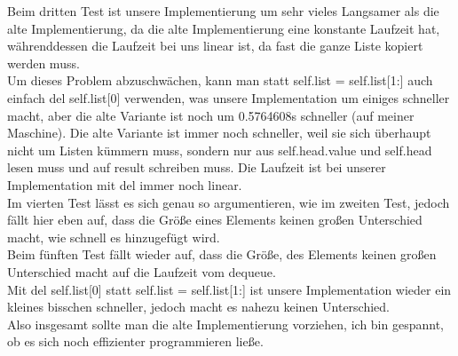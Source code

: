 \documentclass[12pt, a4paper]{article}
\begin{document}
Beim dritten Test ist unsere Implementierung um sehr vieles Langsamer als die alte Implementierung, da die alte Implementierung eine konstante Laufzeit hat, währenddessen die Laufzeit bei uns linear ist, da fast die ganze Liste kopiert werden muss. \\
Um dieses Problem abzuschwächen, kann man statt self.list = self.list[1:] auch einfach del self.list[0] verwenden, was unsere Implementation um einiges schneller macht, aber die alte Variante ist noch um 0.5764608s schneller (auf meiner Maschine). Die alte Variante ist immer noch schneller, weil sie sich überhaupt nicht um Listen kümmern muss, sondern nur aus self.head.value und self.head lesen muss und auf result schreiben muss. Die Laufzeit ist bei unserer Implementation mit del immer noch linear. \\
Im vierten Test lässt es sich genau so argumentieren, wie im zweiten Test, jedoch fällt hier eben auf, dass die Größe eines Elements keinen großen Unterschied macht, wie schnell es hinzugefügt wird.\\
Beim fünften Test fällt wieder auf, dass die Größe, des Elements keinen großen Unterschied macht auf die Laufzeit vom dequeue. \\
Mit del self.list[0] statt self.list = self.list[1:] ist unsere Implementation wieder ein kleines bisschen schneller, jedoch macht es nahezu keinen Unterschied.\\
Also insgesamt sollte man die alte Implementierung vorziehen, ich bin gespannt, ob es sich noch effizienter programmieren ließe.
\end{document}
